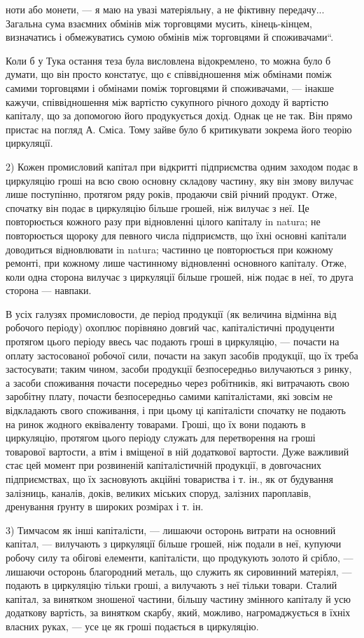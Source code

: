 ноти або монети, — я маю на увазі матеріяльну, а не фіктивну передачу...
Загальна сума взаємних обмінів між торговцями мусить, кінець-кінцем,
визначатись і обмежуватись сумою обмінів між торговцями й споживачами“.

Коли б у Тука остання теза була висловлена відокремлено, то можна
було б думати, що він просто констатує, що є співвідношення між обмінами
поміж самими торговцями і обмінами поміж торговцями й споживачами, —
інакше кажучи, співвідношення між вартістю сукупного річного доходу й
вартістю капіталу, що за допомогою його продукується дохід. Однак це
не так. Він прямо пристає на погляд А. Сміса. Тому зайве було б
критикувати зокрема його теорію циркуляції.

2) Кожен промисловий капітал при відкритті підприємства одним заходом
подає в циркуляцію гроші на всю свою основну складову частину, яку
він змову вилучає лише поступінно, протягом ряду років, продаючи свій
річний продукт. Отже, спочатку він подає в циркуляцію більше грошей,
ніж вилучає з неї. Це повторюється кожного разу при відновленні цілого
капіталу in natura; не повторюється щороку для певного числа підприємств,
що їхні основні капітали доводиться відновлювати in natura; частинно
це повторюється при кожному ремонті, при кожному лише частинному
відновленні основного капіталу. Отже, коли одна сторона
вилучає з циркуляції більше грошей, ніж подає в неї, то друга сторона —
навпаки.

В усіх галузях промисловости, де період продукції (як величина
відмінна від робочого періоду) охоплює порівняно довгий час, капіталістичні
продуценти протягом цього періоду ввесь час подають гроші в циркуляцію,
— почасти на оплату застосованої робочої сили, почасти на закуп
засобів продукції, що їх треба застосувати; таким чином, засоби продукції
безпосередньо вилучаються з ринку, а засоби споживання почасти посередньо
через робітників, які витрачають свою заробітну плату, почасти
безпосередньо самими капіталістами, які зовсім не відкладають свого
споживання, і при цьому ці капіталісти спочатку не подають на ринок
жодного еквіваленту товарами. Гроші, що їх вони подають в циркуляцію,
протягом цього періоду служать для перетворення на гроші товарової
вартости, а втім і вміщеної в ній додаткової вартости. Дуже важливий
стає цей момент при розвиненій капіталістичній продукції, в довгочасних
підприємствах, що їх засновують акційні товариства і т. ін., як
от будування залізниць, каналів, доків, великих міських споруд, залізних
пароплавів, дренування ґрунту в широких розмірах і т. ін.

3) Тимчасом як інші капіталісти, — лишаючи осторонь витрати на
основний капітал, — вилучають з циркуляції більше грошей, ніж подали в
неї, купуючи робочу силу та обігові елементи, капіталісти, що продукують
золото й срібло, — лишаючи осторонь благородний металь, що служить як
сировинний матеріял, — подають в циркуляцію тільки гроші, а вилучають
з неї тільки товари. Сталий капітал, за винятком зношеної частини,
більшу частину змінного капіталу й усю додаткову вартість, за винятком
скарбу, який, можливо, нагромаджується в їхніх власних руках, — усе це
як гроші подається в циркуляцію.
